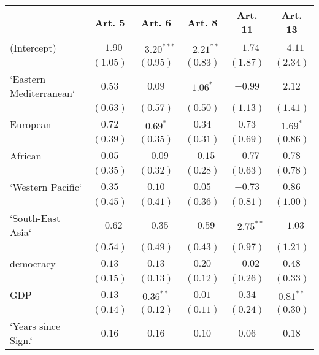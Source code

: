 
\begin{table}[!h]
\begin{center}
\begin{tabular}{l c c c c c }
\toprule
 & Art. 5 & Art. 6 & Art. 8 & Art. 11 & Art. 13 \\
\midrule
(Intercept)             & $-1.90$      & $-3.20^{***}$ & $-2.21^{**}$ & $-1.74$      & $-4.11$      \\
                        & $(1.05)$     & $(0.95)$      & $(0.83)$     & $(1.87)$     & $(2.34)$     \\
`Eastern Mediterranean` & $0.53$       & $0.09$        & $1.06^{*}$   & $-0.99$      & $2.12$       \\
                        & $(0.63)$     & $(0.57)$      & $(0.50)$     & $(1.13)$     & $(1.41)$     \\
European                & $0.72$       & $0.69^{*}$    & $0.34$       & $0.73$       & $1.69^{*}$   \\
                        & $(0.39)$     & $(0.35)$      & $(0.31)$     & $(0.69)$     & $(0.86)$     \\
African                 & $0.05$       & $-0.09$       & $-0.15$      & $-0.77$      & $0.78$       \\
                        & $(0.35)$     & $(0.32)$      & $(0.28)$     & $(0.63)$     & $(0.78)$     \\
`Western Pacific`       & $0.35$       & $0.10$        & $0.05$       & $-0.73$      & $0.86$       \\
                        & $(0.45)$     & $(0.41)$      & $(0.36)$     & $(0.81)$     & $(1.00)$     \\
`South-East Asia`       & $-0.62$      & $-0.35$       & $-0.59$      & $-2.75^{**}$ & $-1.03$      \\
                        & $(0.54)$     & $(0.49)$      & $(0.43)$     & $(0.97)$     & $(1.21)$     \\
democracy               & $0.13$       & $0.13$        & $0.20$       & $-0.02$      & $0.48$       \\
                        & $(0.15)$     & $(0.13)$      & $(0.12)$     & $(0.26)$     & $(0.33)$     \\
GDP                     & $0.13$       & $0.36^{**}$   & $0.01$       & $0.34$       & $0.81^{**}$  \\
                        & $(0.14)$     & $(0.12)$      & $(0.11)$     & $(0.24)$     & $(0.30)$     \\
`Years since Sign.`     & $0.16$       & $0.16$        & $0.10$       & $0.06$       & $0.18$       \\

\end{tabular}
\end{center}
\end{table}
